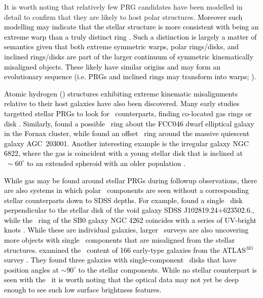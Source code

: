 \documentclass[fleqn,usenatbib]{mnras}
\newcommand{\hi}{\text{H\,\sc{i}}}
\newcommand{\KS}[1]{\textcolor{black}{#1}}
\begin{document}
It is worth noting that relatively few PRG candidates have been modelled in detail to confirm that they are likely to host polar structures.
\textcolor{black}{Moreover such modelling may indicate that the stellar structure is more consistent with being an extreme warp than a truly distinct ring \citep[e.g.][]{Jorza2009}.  Such a distinction is largely a matter of semantics given that both extreme symmetric warps, polar rings/disks, and inclined rings/disks are part of the larger continuum of symmetric kinematically misaligned objects.  These likely have similar origins and may form an evolutionary sequence (i.e. PRGs and inclined rings may transform into warps;  \citealt{Brook2008}).}


\textcolor{black}{Atomic hydrogen (\hi) structures exhibiting extreme kinematic misalignments relative to their host galaxies have also been discovered.  \KS{Many early studies targetted stellar PRGs to look for \hi\ counterparts, finding co-located gas rings} \citep[e.g.\ ][]{vanGorkom87} or disk \citep{Brook2008,Dzudzar2021}.  %
Similarly, \citet{DeRijcke2013} found a possible \hi\ ring about the FCC046 dwarf elliptical galaxy in the Fornax cluster, while \citet{Bait2020} found an offset \hi\ ring around the massive quiescent galaxy AGC~203001.  Another interesting example is the irregular galaxy NGC 6822, where 
 the gas is coincident with a young stellar disk that is inclined at $~\sim60^{\circ}$ to an extended spheroid with an older population \citep{Demers2006,Zhang2021}.  }
 
 \KS{While gas may be found around stellar PRGs during followup observations, there are also systems in which polar \hi\ components are seen without a corresponding stellar counterparts down to SDSS depths. For example, \citet{Stanonik2009} found a single \hi\ disk perpendicular to the stellar disk of the void galaxy SDSS J102819.24+623502.6., while the \hi\ ring of the SB0 galaxy NGC 4262 coincides with a series of UV-bright knots \citep{Buson2011}.}  \textcolor{black}{While these are individual galaxies, larger \hi\ surveys are \KS{also uncovering more objects} with single \hi\ components that are misaligned from the stellar structures.  \citet{Serra2012} examined the \hi\ content of 166 early-type galaxies from the ATLAS$^{\rm{3D}}$ survey \citep{Cappellari2011}.  They found three galaxies with single-component \hi\ disks that have position angles at $\sim 90^{\circ}$ to the stellar components. \KS{While no stellar counterpart is seen with the \hi\, it is worth} noting that the optical data may not yet be deep enough to see such low surface brightness features.}
\end{document}
